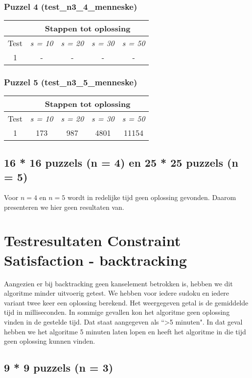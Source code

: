 \documentclass[]{report}
\begin{document}
\begin{appendices}
\subsection{Puzzel 4 (test\_n3\_4\_menneske)}
\begin{tabular}{|c|c|c|c|c|}
\hline  &  \multicolumn{4}{|c|}{Stappen tot oplossing} \\ 
\hline Test & \textit{s = 10} & \textit{s = 20} & \textit{s = 30} & \textit{s = 50} \\ 
\hline
\hline 1 & - & - & - & - \\ 
\hline
\end{tabular} 
\subsection{Puzzel 5 (test\_n3\_5\_menneske)}
\begin{tabular}{|c|c|c|c|c|}
\hline  &  \multicolumn{4}{|c|}{Stappen tot oplossing} \\ 
\hline Test & \textit{s = 10} & \textit{s = 20} & \textit{s = 30} & \textit{s = 50} \\ 
\hline
\hline 1 & 173 & 987 & 4801 & 11154 \\ 
\hline
\end{tabular} 
\section{16 * 16 puzzels (n = 4) en 25 * 25 puzzels (n = 5)}
Voor $n = 4$ en $n = 5$ wordt in redelijke tijd geen oplossing gevonden. Daarom presenteren we hier geen resultaten van.

\chapter{Testresultaten Constraint Satisfaction - backtracking}
Aangezien er bij backtracking geen kanselement betrokken is, hebben we dit algoritme minder uitvoerig getest. We hebben voor iedere sudoku en iedere variant twee keer een oplossing berekend. Het weergegeven getal is de gemiddelde tijd in milliseconden. In sommige gevallen kon het algoritme geen oplossing vinden in de gestelde tijd. Dat staat aangegeven als \textquotedblleft\textgreater 5 minuten". In dat geval hebben we het algoritme 5 minuten laten lopen en heeft het algoritme in die tijd geen oplossing kunnen vinden.
\section{9 * 9 puzzels (n = 3)}

\end{appendices}
\end{document}
